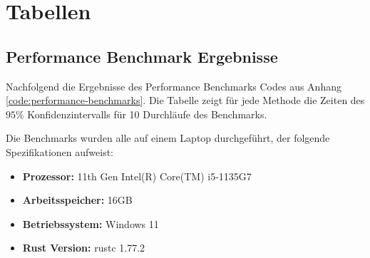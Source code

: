 \chapter{Tabellen}
\label{anhang:chapter-tabellen}

\section{Performance Benchmark Ergebnisse}
\label{anhang:section-tabellen-benchmark}

Nachfolgend die Ergebnisse des Performance Benchmarks Codes aus Anhang \ref{code:performance-benchmarks}. Die Tabelle zeigt für jede Methode die Zeiten des $95\%$ Konfidenzintervalls für 10 Durchläufe des Benchmarks.

Die Benchmarks wurden alle auf einem Laptop durchgeführt, der folgende Spezifikationen aufweist:

\begin{itemize}
    \item \vspace{-0.1cm} \textbf{Prozessor:} 11th Gen Intel(R) Core(TM) i5-1135G7
    \item \vspace{-0.1cm} \textbf{Arbeitsspeicher:} 16GB
    \item \vspace{-0.1cm} \textbf{Betriebssystem:} Windows 11
    \item \vspace{-0.1cm} \textbf{Rust Version:} rustc 1.77.2
\end{itemize}

\vspace*{1.25cm}




